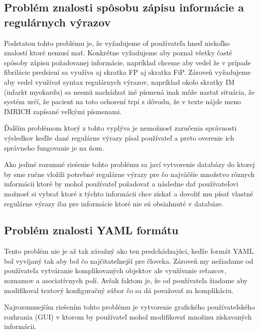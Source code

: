 \subsection{Problém znalosti spôsobu zápisu informácie a regulárnych výrazov}

Podstatou tohto problému je, že vyžadujeme of používateľa hneď niekoľko znalostí ktoré nemusí mať. Konkrétne vyžadujeme aby poznal všetky časté spôsoby zápisu požadovanej informácie, napríklad chceme aby vedel že v prípade fibrilácie predsiení sa využíva aj skratka FP aj skratka FiP. Zároveň vyžadujeme aby vedel využívať syntax regulárnych výrazov, napríklad okolo skratky IM (infarkt myokardu) sa nesmú nachádzať iné písmená inak môže nastať situácia, že systém určí, že pacient na toto ochorení trpí z dôvodu, že v texte nájde meno IMRICH zapísané veľkými písmenami. 

Ďalším problémom ktorý z tohto vyplýva je nemožnosť zaručenia správnosti výsledkov keďže dané regulárne výrazy písal používateľ a preto overenie ich správneho fungovanie je na ňom. 

Ako jediné rozumné riešenie tohto problému sa javí vytvorenie databázy do ktorej by sme ručne vložili potrebné regulárne výrazy pre čo najväčšie množstvo rôznych informácii ktoré by mohol používateľ požadovať a následne dať používateľovi možnosť si vybrať ktoré z týchto informácii chce získať a dovoliť mu písať vlastné regulárne výrazy iba pre informácie ktoré nie sú obsiahnuté v databáze.

\subsection{Problém znalosti YAML formátu}

Tento problém nie je až tak závažný ako ten predchádzajúci, keďže formát YAML bol vyvíjaný tak aby bol čo najčitateľnejší pre človeka. Zároveň my nežiadame od používateľa vytváranie komplikovaných objektov ale využívanie reťazcov, zoznamov a asociatívnych polí. Avšak faktom je, že od používateľa žiadame aby modifikoval textový konfiguračný súbor čo sa dá považovať za komplikáciu.

Najrozumnejším riešením tohto problému je vytvorenie grafického používateľského rozhrania (GUI) v ktorom by používateľ mohol modifikovať množinu získavaných informácii. 